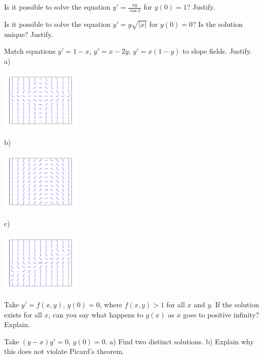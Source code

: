 \documentclass[12pt]{book}
\begin{document}
\begin{exercise}
Is it possible to solve the equation $y' = \frac{xy}{\cos x}$ for $y(0) = 1$?
Justify.
\end{exercise}

\begin{exercise}
Is it possible to solve the equation $y' = y\sqrt{\lvert x\rvert}$ for
$y(0) = 0$?  Is the solution unique?
Justify.
\end{exercise}

\begin{exercise}
Match equations $y'=1-x$, $y'=x-2y$, $y' = x(1-y)$ to slope fields.
Justify.
\\
a)
\parbox[c]{1.6in}{\includegraphics[width=1.5in]{figures/yprimex1minusyslope}}
b)
\parbox[c]{1.6in}{\includegraphics[width=1.5in]{figures/yprime1minusxslope}}
c)
\parbox[c]{1.6in}{\includegraphics[width=1.5in]{figures/yprimexminus2yslope}}
\end{exercise}

\begin{exercise}[challenging]
Take $y' = f(x,y)$, $y(0) = 0$, where $f(x,y) > 1$
for all $x$ and $y$.  If
the solution exists for all $x$, can you say
what happens to $y(x)$ as $x$ goes to positive infinity?  Explain.
\end{exercise}

\begin{exercise}[challenging]
Take $(y-x)y' = 0$, $y(0) = 0$.  a) Find two distinct solutions.  b)
Explain why this does not violate Picard's theorem.  
\end{exercise}
\end{document}
